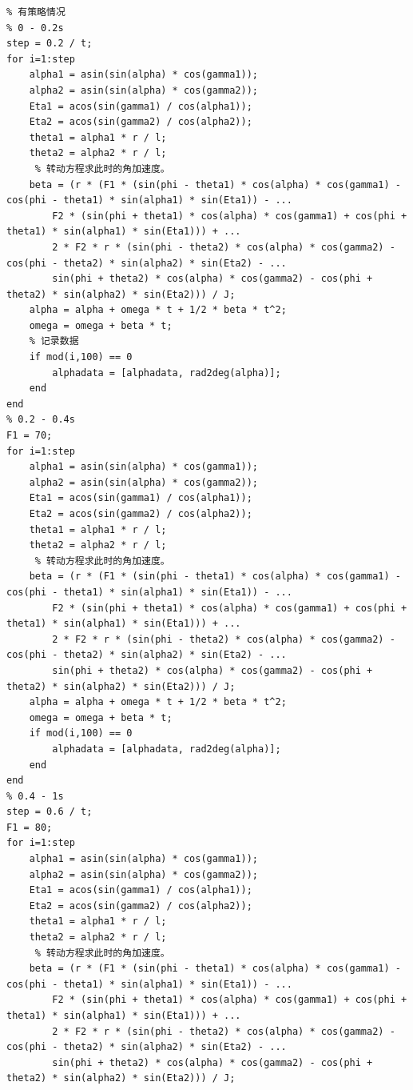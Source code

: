 \documentclass{cumcm}
\begin{document}
\begin{lstlisting}
% 有策略情况
% 0 - 0.2s
step = 0.2 / t;
for i=1:step
    alpha1 = asin(sin(alpha) * cos(gamma1));
    alpha2 = asin(sin(alpha) * cos(gamma2));
    Eta1 = acos(sin(gamma1) / cos(alpha1));
    Eta2 = acos(sin(gamma2) / cos(alpha2));
    theta1 = alpha1 * r / l;
    theta2 = alpha2 * r / l;
     % 转动方程求此时的角加速度。
    beta = (r * (F1 * (sin(phi - theta1) * cos(alpha) * cos(gamma1) - cos(phi - theta1) * sin(alpha1) * sin(Eta1)) - ...
        F2 * (sin(phi + theta1) * cos(alpha) * cos(gamma1) + cos(phi + theta1) * sin(alpha1) * sin(Eta1))) + ...
        2 * F2 * r * (sin(phi - theta2) * cos(alpha) * cos(gamma2) - cos(phi - theta2) * sin(alpha2) * sin(Eta2) - ...
        sin(phi + theta2) * cos(alpha) * cos(gamma2) - cos(phi + theta2) * sin(alpha2) * sin(Eta2))) / J;
    alpha = alpha + omega * t + 1/2 * beta * t^2;
    omega = omega + beta * t;
    % 记录数据
    if mod(i,100) == 0
        alphadata = [alphadata, rad2deg(alpha)];
    end
end
% 0.2 - 0.4s
F1 = 70;
for i=1:step
    alpha1 = asin(sin(alpha) * cos(gamma1));
    alpha2 = asin(sin(alpha) * cos(gamma2));
    Eta1 = acos(sin(gamma1) / cos(alpha1));
    Eta2 = acos(sin(gamma2) / cos(alpha2));
    theta1 = alpha1 * r / l;
    theta2 = alpha2 * r / l;
     % 转动方程求此时的角加速度。
    beta = (r * (F1 * (sin(phi - theta1) * cos(alpha) * cos(gamma1) - cos(phi - theta1) * sin(alpha1) * sin(Eta1)) - ...
        F2 * (sin(phi + theta1) * cos(alpha) * cos(gamma1) + cos(phi + theta1) * sin(alpha1) * sin(Eta1))) + ...
        2 * F2 * r * (sin(phi - theta2) * cos(alpha) * cos(gamma2) - cos(phi - theta2) * sin(alpha2) * sin(Eta2) - ...
        sin(phi + theta2) * cos(alpha) * cos(gamma2) - cos(phi + theta2) * sin(alpha2) * sin(Eta2))) / J;
    alpha = alpha + omega * t + 1/2 * beta * t^2;
    omega = omega + beta * t;
    if mod(i,100) == 0
        alphadata = [alphadata, rad2deg(alpha)];
    end
end
% 0.4 - 1s
step = 0.6 / t;
F1 = 80;
for i=1:step
    alpha1 = asin(sin(alpha) * cos(gamma1));
    alpha2 = asin(sin(alpha) * cos(gamma2));
    Eta1 = acos(sin(gamma1) / cos(alpha1));
    Eta2 = acos(sin(gamma2) / cos(alpha2));
    theta1 = alpha1 * r / l;
    theta2 = alpha2 * r / l;
     % 转动方程求此时的角加速度。
    beta = (r * (F1 * (sin(phi - theta1) * cos(alpha) * cos(gamma1) - cos(phi - theta1) * sin(alpha1) * sin(Eta1)) - ...
        F2 * (sin(phi + theta1) * cos(alpha) * cos(gamma1) + cos(phi + theta1) * sin(alpha1) * sin(Eta1))) + ...
        2 * F2 * r * (sin(phi - theta2) * cos(alpha) * cos(gamma2) - cos(phi - theta2) * sin(alpha2) * sin(Eta2) - ...
        sin(phi + theta2) * cos(alpha) * cos(gamma2) - cos(phi + theta2) * sin(alpha2) * sin(Eta2))) / J;

\end{lstlisting}
\end{document}

